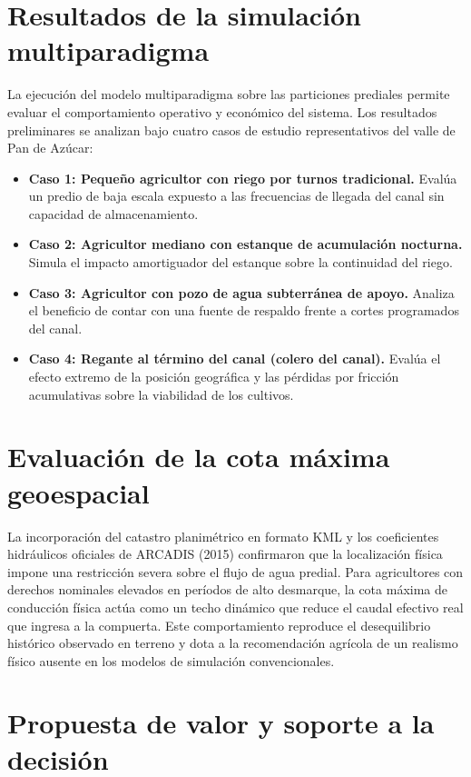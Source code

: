 \documentclass[12pt]{report}
\begin{document}
\section{Resultados de la simulación multiparadigma}

La ejecución del modelo multiparadigma sobre las particiones prediales permite evaluar el comportamiento operativo y económico del sistema. Los resultados preliminares se analizan bajo cuatro casos de estudio representativos del valle de Pan de Azúcar:
\begin{itemize}
    \item \textbf{Caso 1: Pequeño agricultor con riego por turnos tradicional.} Evalúa un predio de baja escala expuesto a las frecuencias de llegada del canal sin capacidad de almacenamiento.
    \item \textbf{Caso 2: Agricultor mediano con estanque de acumulación nocturna.} Simula el impacto amortiguador del estanque sobre la continuidad del riego.
    \item \textbf{Caso 3: Agricultor con pozo de agua subterránea de apoyo.} Analiza el beneficio de contar con una fuente de respaldo frente a cortes programados del canal.
    \item \textbf{Caso 4: Regante al término del canal (colero del canal).} Evalúa el efecto extremo de la posición geográfica y las pérdidas por fricción acumulativas sobre la viabilidad de los cultivos.
\end{itemize}

\section{Evaluación de la cota máxima geoespacial}

La incorporación del catastro planimétrico en formato KML y los coeficientes hidráulicos oficiales de ARCADIS (2015) confirmaron que la localización física impone una restricción severa sobre el flujo de agua predial. Para agricultores con derechos nominales elevados en períodos de alto desmarque, la cota máxima de conducción física actúa como un techo dinámico que reduce el caudal efectivo real que ingresa a la compuerta. Este comportamiento reproduce el desequilibrio histórico observado en terreno y dota a la recomendación agrícola de un realismo físico ausente en los modelos de simulación convencionales.

\section{Propuesta de valor y soporte a la decisión}
\end{document}
